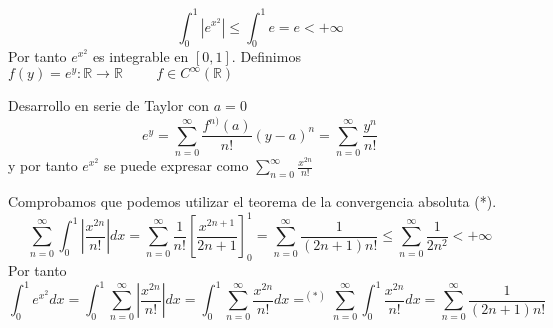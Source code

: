 
\[ \int_0^1|e^{x^2}| \leq \int_0^1e = e < +\infty
\]
Por tanto $e^{x^2}$ es integrable en $[0, 1]$. Definimos $f(y)=e^y:\mathbb{R}\rightarrow\mathbb{R} \hspace{1cm} f\in C^{\infty}(\mathbb{R})$

Desarrollo en serie de Taylor con $a=0$
\[ e^y = \sum_{n=0}^{\infty} \frac{f^{n)}(a)}{n!}(y-a)^n=
\sum_{n=0}^{\infty} \frac{y^n}{n!}
\] y por tanto $e^{x^2}$ se puede expresar como $\sum_{n=0}^{\infty} \frac{x^{2n}}{n!}$

Comprobamos que podemos utilizar el teorema de la convergencia absoluta (*).
\[   \sum_{n=0}^{\infty} \int_0^1 \left| \frac{x^{2n}}{n!} \right| dx
 =   \sum_{n=0}^{\infty} \frac{1}{n!} \left[ \frac{x^{2n+1}}{2n+1} \right]_0^1
 =   \sum_{n=0}^{\infty} \frac{1}{(2n+1) n!} 
\leq \sum_{n=0}^{\infty} \frac{1}{2n^2} < +\infty
\]
Por tanto
\[ \int_0^1 e^{x^2} dx
 = \int_0^1 \sum_{n=0}^{\infty} \left| \frac{x^{2n}}{n!} \right| dx
 = \int_0^1 \sum_{n=0}^{\infty} \frac{x^{2n}}{n!} dx
 =^{(*)} \sum_{n=0}^{\infty} \int_0^1 \frac{x^{2n}}{n!} dx
 = \sum_{n=0}^{\infty} \frac{1}{(2n+1) n!}
\]
